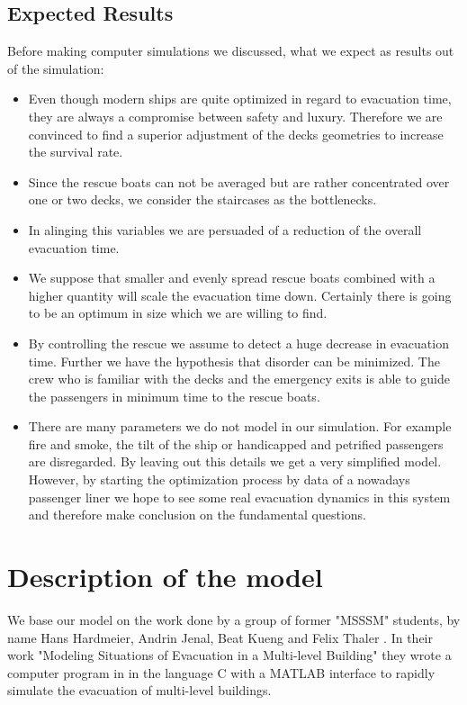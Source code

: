 \documentclass[11pt]{article}
\begin{document}
\subsection{Expected Results}
Before making computer simulations we discussed, what we expect as results out of the simulation:
\begin{itemize}
\item Even though modern ships are quite optimized in regard to evacuation time, they are always a compromise between safety and luxury. Therefore we are convinced to find a superior adjustment of the decks geometries to increase the survival rate.
\item Since the rescue boats can not be averaged but are rather concentrated over one or two decks, we consider the staircases as the bottlenecks.
\item In alinging this variables we are persuaded of a reduction of the overall evacuation time.
\item We suppose that smaller and evenly spread rescue boats combined with a higher quantity will scale the evacuation time down. Certainly there is going to be an optimum in size which we are willing to find.
\item By controlling the rescue we assume to detect a huge decrease in evacuation time. Further we have the hypothesis that disorder can be minimized. The crew who is familiar with the decks and the emergency exits is able to guide the passengers in minimum time to the rescue boats.
\item There are many parameters we do not model in our simulation. For example fire and smoke, the tilt of the ship or handicapped and petrified passengers are disregarded. By leaving out this details we get a very simplified model. However, by starting the optimization process by data of a nowadays passenger liner we hope to see some real evacuation dynamics in this system and therefore make conclusion on the fundamental questions.
\end{itemize}

\section{Description of the model}
We base our model on the work done by a group of former "MSSSM" students, by name Hans Hardmeier, Andrin Jenal, Beat Kueng and Felix Thaler \cite{Building}. In their work "Modeling Situations of Evacuation in a Multi-level Building" they wrote a computer program in in the language C with a MATLAB interface to rapidly simulate the evacuation of multi-level buildings.\bigskip
\end{document}
